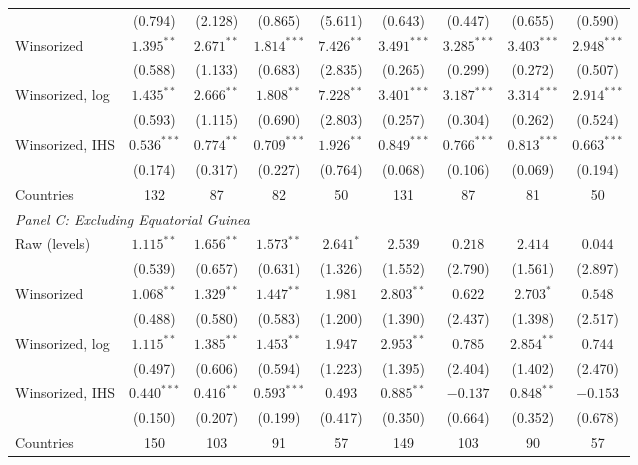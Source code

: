 \begin{table}[htbp]
{\begin{tabular}{lcccccccc}
 & (0.794) & (2.128) & (0.865) & (5.611) & (0.643) & (0.447) & (0.655) & (0.590) \\
Winsorized & $1.395^{**}$ & $2.671^{**}$ & $1.814^{***}$ & $7.426^{**}$ & $3.491^{***}$ & $3.285^{***}$ & $3.403^{***}$ & $2.948^{***}$ \\
 & (0.588) & (1.133) & (0.683) & (2.835) & (0.265) & (0.299) & (0.272) & (0.507) \\
Winsorized, log & $1.435^{**}$ & $2.666^{**}$ & $1.808^{**}$ & $7.228^{**}$ & $3.401^{***}$ & $3.187^{***}$ & $3.314^{***}$ & $2.914^{***}$ \\
 & (0.593) & (1.115) & (0.690) & (2.803) & (0.257) & (0.304) & (0.262) & (0.524) \\
Winsorized, IHS & $0.536^{***}$ & $0.774^{**}$ & $0.709^{***}$ & $1.926^{**}$ & $0.849^{***}$ & $0.766^{***}$ & $0.813^{***}$ & $0.663^{***}$ \\
 & (0.174) & (0.317) & (0.227) & (0.764) & (0.068) & (0.106) & (0.069) & (0.194) \\
Countries & 132 & 87 & 82 & 50 & 131 & 87 & 81 & 50 \\
\midrule
\multicolumn{9}{l}{\textit{Panel C: Excluding Equatorial Guinea}} \\
Raw (levels) & $1.115^{**}$ & $1.656^{**}$ & $1.573^{**}$ & $2.641^{*}$ & $2.539$ & $0.218$ & $2.414$ & $0.044$ \\
 & (0.539) & (0.657) & (0.631) & (1.326) & (1.552) & (2.790) & (1.561) & (2.897) \\
Winsorized & $1.068^{**}$ & $1.329^{**}$ & $1.447^{**}$ & $1.981$ & $2.803^{**}$ & $0.622$ & $2.703^{*}$ & $0.548$ \\
 & (0.488) & (0.580) & (0.583) & (1.200) & (1.390) & (2.437) & (1.398) & (2.517) \\
Winsorized, log & $1.115^{**}$ & $1.385^{**}$ & $1.453^{**}$ & $1.947$ & $2.953^{**}$ & $0.785$ & $2.854^{**}$ & $0.744$ \\
 & (0.497) & (0.606) & (0.594) & (1.223) & (1.395) & (2.404) & (1.402) & (2.470) \\
Winsorized, IHS & $0.440^{***}$ & $0.416^{**}$ & $0.593^{***}$ & $0.493$ & $0.885^{**}$ & $-0.137$ & $0.848^{**}$ & $-0.153$ \\
 & (0.150) & (0.207) & (0.199) & (0.417) & (0.350) & (0.664) & (0.352) & (0.678) \\
Countries & 150 & 103 & 91 & 57 & 149 & 103 & 90 & 57 \\
\bottomrule
\end{tabular}}
\par\vspace{4pt}

\end{table}
